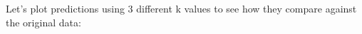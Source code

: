 \documentclass[10pt]{article}
\begin{document}
Let's plot predictions using 3 different k values to see how they compare 
against the original data:

\begin{figure}[H]    
\end{figure}
\end{document}

